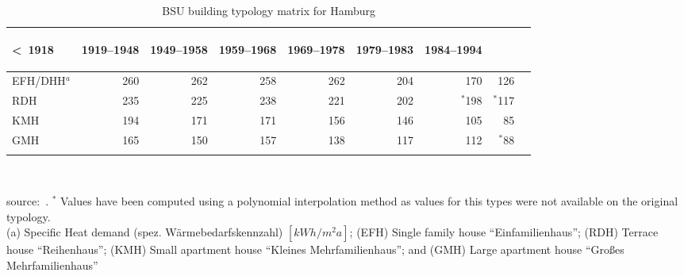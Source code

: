 \begin{table}[htbp]
  \centering
  \caption{BSU building typology matrix for Hamburg }
  \label{tab:HH}%
    \begin{tabular}{l r rrr rrr r}
    \addlinespace
    \toprule
    \begin{sideways}\textless~1918\end{sideways}&  %
    \begin{sideways}1919--1948\end{sideways}&     %
    \begin{sideways}1949--1958\end{sideways}&     %
    \begin{sideways}1959--1968\end{sideways}&     %
    \begin{sideways}1969--1978\end{sideways}&     %
    \begin{sideways}1979--1983\end{sideways}&     %
    \begin{sideways}1984--1994\end{sideways}\\    %
    \midrule
EFH/DHH$^a$  &260 &262 &258 &262 &204 &170 & 126 \\
RDH          &235 &225 &238 &221 &202 &$^{*}$198& $^{*}$117 \\
KMH          &194 &171 &171 &156 &146 &105 & 85 \\
GMH          &165 &150 &157 &138 &117 &112 & $^{*}$88 \\
    \bottomrule
    \addlinespace
    \end{tabular}\\
    \begin{footnotesize}
        source:~\cite{BSU.2011}.
    $^{*}$ Values have been computed using a polynomial interpolation method as 
values for this types were not available on the original typology.\\
    (a) Specific Heat demand (spez. W\"armebedarfskennzahl)
    $[kWh/m^{2}a]$;
(EFH) Single family house ``Einfamilienhaus'';
(RDH) Terrace house ``Reihenhaus'';
(KMH) Small apartment house ``Kleines Mehrfamilienhaus''; and
(GMH) Large apartment house ``Großes Mehrfamilienhaus''\\
    \end{footnotesize}
\end{table}